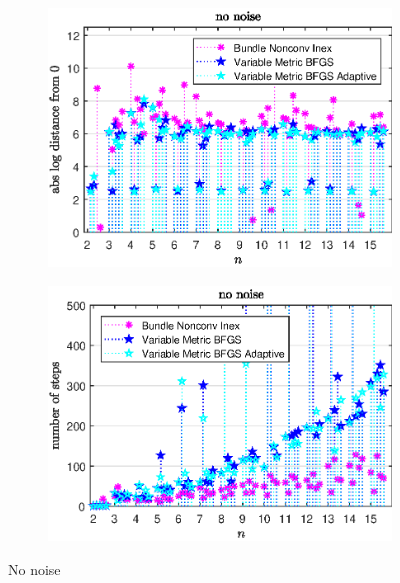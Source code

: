 \begin{figure}[ht]%
	\begin{subfigure}{0.49\textwidth}
		\includegraphics[width=\textwidth]{Pictures/Plots/no_noise2.eps}%
	\end{subfigure}
	\begin{subfigure}{0.49\textwidth}
		\includegraphics[width=\textwidth]{Pictures/Plots/steps_no_noise2.eps}%
	\end{subfigure}
	\label{fig_no_noise}
	\caption{No noise}
\end{figure}


